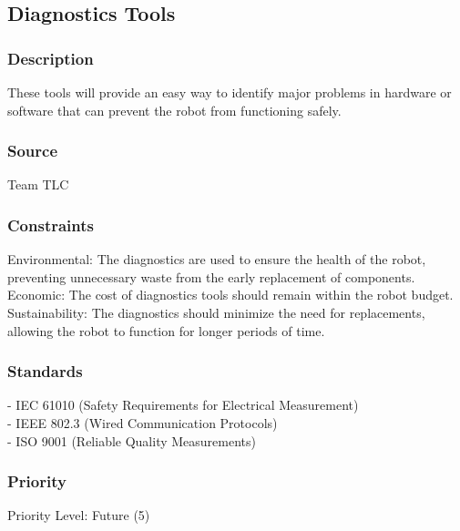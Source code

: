 \subsection{Diagnostics Tools}
\subsubsection{Description}
These tools will provide an easy way to identify major problems in hardware or software that can prevent the robot from functioning safely.
\subsubsection{Source}
Team TLC
\subsubsection{Constraints}
Environmental: The diagnostics are used to ensure the health of the robot, preventing unnecessary waste from the early replacement of components.\\
Economic: The cost of diagnostics tools should remain within the robot budget.\\
Sustainability: The diagnostics should minimize the need for replacements, allowing the robot to function for longer periods of time.
\subsubsection{Standards}
- IEC 61010 (Safety Requirements for Electrical Measurement)\\
- IEEE 802.3 (Wired Communication Protocols)\\
- ISO 9001 (Reliable Quality Measurements)
\subsubsection{Priority}
Priority Level: Future (5)
